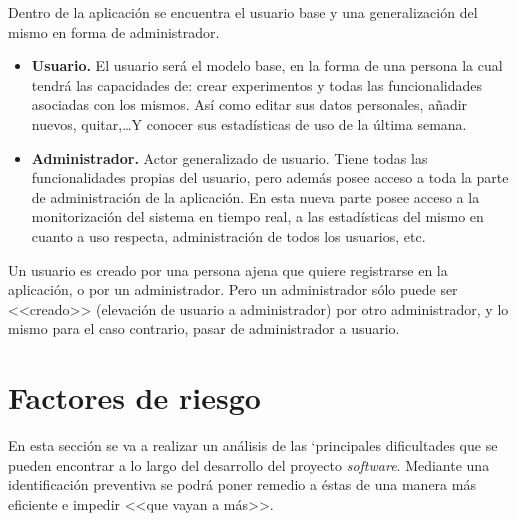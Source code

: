 Dentro de la aplicación se encuentra el usuario base y una generalización del mismo en forma de administrador. 
\begin{itemize}
\item \textbf{Usuario.} El usuario será el modelo base, en la forma de una persona la cual tendrá las capacidades de: crear experimentos y todas las funcionalidades asociadas con los mismos. Así como editar sus datos personales, añadir nuevos, quitar,\dots Y conocer sus estadísticas de uso de la última semana.

\item \textbf{Administrador.} Actor generalizado de usuario. Tiene todas las funcionalidades propias del usuario, pero además posee acceso a toda la parte de administración de la aplicación. En esta nueva parte posee acceso a la monitorización del sistema en tiempo real, a las estadísticas del mismo en cuanto a uso respecta, administración de todos los usuarios, etc. 
\end{itemize}

Un usuario es creado por una persona ajena que quiere registrarse en la aplicación, o por un administrador. Pero un administrador sólo puede ser <<creado>> (elevación de usuario a administrador) por otro administrador, y lo mismo para el caso contrario, pasar de administrador a usuario.


\section{Factores de riesgo}\label{factores-de-riesgo}
En esta sección se va a realizar un análisis de las `principales dificultades que se pueden encontrar a lo largo del desarrollo del proyecto \textit{software}. Mediante una identificación preventiva se podrá poner remedio a éstas de una manera más eficiente e impedir <<que vayan a más>>.

